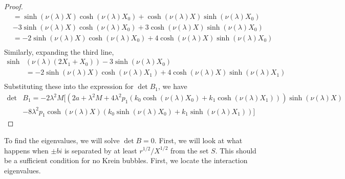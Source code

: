 \documentclass[thesis.tex]{subfiles}
\begin{document}
\begin{lemma}
\begin{proof}
\begin{align*}
&= \sinh(\nu(\lambda)X)\cosh(\nu(\lambda)X_0) 
+ \cosh(\nu(\lambda)X)\sinh(\nu(\lambda)X_0) \\
&- 3 \sinh(\nu(\lambda)X)\cosh(\nu(\lambda)X_0) + 3 \cosh(\nu(\lambda)X)\sinh(\nu(\lambda)X_0)  \\
&= -2 \sinh(\nu(\lambda)X)\cosh(\nu(\lambda)X_0) 
+ 4 \cosh(\nu(\lambda)X)\sinh(\nu(\lambda)X_0) \\
\end{align*}
Similarly, expanding the third line,
\begin{align*}
\sinh&(\nu(\lambda)(2 X_1 + X_0)) - 3 \sinh(\nu(\lambda)X_0) \\
&= -2 \sinh(\nu(\lambda)X)\cosh(\nu(\lambda)X_1) 
+ 4 \cosh(\nu(\lambda)X)\sinh(\nu(\lambda)X_1) \\
\end{align*}
Substituting these into the expression for $\det B_1$, we have
\begin{align*}
\det &B_1 = -2 \lambda^2 M \Big[ (2a + \lambda^2 M 
+ 4 \lambda^2 p_1(k_0 \cosh(\nu(\lambda)X_0) + k_1 \cosh(\nu(\lambda)X_1)  ) ) \sinh(\nu(\lambda)X)  \\
&- 8 \lambda^2 p_1 \cosh(\nu(\lambda)X) \left( k_0 \sinh(\nu(\lambda)X_0) 
+ k_1 \sinh(\nu(\lambda)X_1) \right) \Big] 
\end{align*}
\end{proof}
\end{lemma}

To find the eigenvalues, we will solve $\det B = 0$. First, we will look at what happens when $\pm bi$ is separated by at least $r^{1/2}/X^{1/2}$ from the set $S$. This should be a sufficient condition for no Krein bubbles. First, we locate the interaction eigenvalues.
\end{document}
